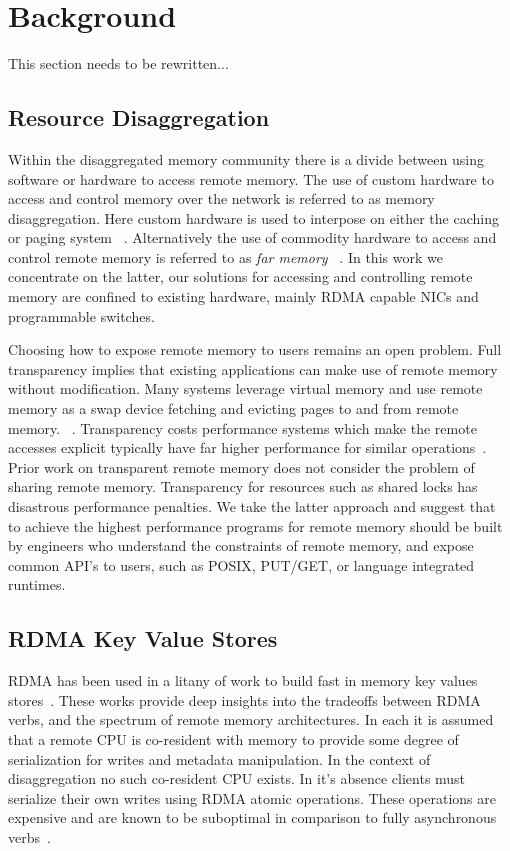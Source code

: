 \section{Background}

This section needs to be rewritten...

\subsection{Resource Disaggregation}


Within the disaggregated memory community there is a divide between using
software or hardware to access remote memory.  The use of custom hardware to
access and control memory over the network is referred to as memory
disaggregation. Here custom hardware is used to interpose on either the caching
or paging system ~\cite{dredbox,rethinking}. Alternatively the use of commodity
hardware to access and control remote memory is referred to as \textit{far
memory} ~\cite{reigons,fastswap, legoos, clover, lite}. In this work we
concentrate on the latter, our solutions for accessing and controlling remote
memory are confined to existing hardware, mainly RDMA capable NICs and
programmable switches.

Choosing how to expose remote memory to users remains an open problem. Full
transparency implies that existing applications can make use of remote memory
without modification. Many systems leverage virtual memory and use remote memory
as a swap device fetching and evicting pages to and from remote memory.
~\cite{fastswap,GMS,infiniswap,leap,ramcloud}. Transparency costs performance
systems which make the remote accesses explicit typically have far higher
performance for similar operations~\cite{aifm}.  Prior work on transparent
remote memory does not consider the problem of sharing remote memory.
Transparency for resources such as shared locks has disastrous performance
penalties.  We take the latter approach and suggest that to achieve the highest
performance programs for remote memory should be built by engineers who
understand the constraints of remote memory, and expose common API's to users,
such as POSIX, PUT/GET, or language integrated runtimes.

\subsection{RDMA Key Value Stores}

RDMA has been used in a litany of work to build fast in memory key values
stores~\cite{farm,MemC3,herd,pilaf,sonuma,storm}. These works provide deep insights
into the tradeoffs between RDMA verbs, and the spectrum of remote memory
architectures. In each it is assumed that a remote CPU is co-resident with
memory to provide some degree of serialization for writes and metadata
manipulation. In the context of disaggregation no such co-resident CPU exists.
In it's absence clients must serialize their own writes using RDMA atomic
operations. These operations are expensive and are known to be suboptimal in
comparison to fully asynchronous verbs~\cite{design-guidelines}.

